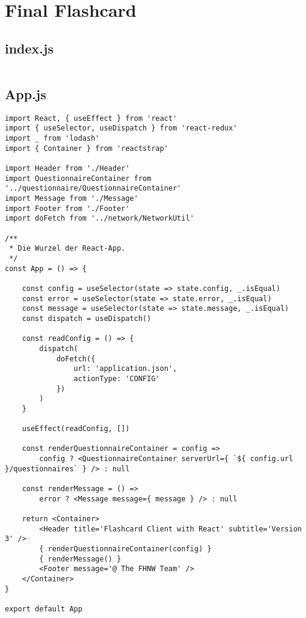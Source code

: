 \section{Final Flashcard}

\subsection{index.js}

\inputminted{javascript}{src/index.js}

\subsection{App.js}

\begin{verbatim}
import React, { useEffect } from 'react'
import { useSelector, useDispatch } from 'react-redux'
import _ from 'lodash'
import { Container } from 'reactstrap'

import Header from './Header'
import QuestionnaireContainer from '../questionnaire/QuestionnaireContainer'
import Message from './Message'
import Footer from './Footer'
import doFetch from '../network/NetworkUtil'

/**
 * Die Wurzel der React-App.
 */
const App = () => {

    const config = useSelector(state => state.config, _.isEqual)
    const error = useSelector(state => state.error, _.isEqual)
    const message = useSelector(state => state.message, _.isEqual)
    const dispatch = useDispatch()

    const readConfig = () => {
        dispatch(
            doFetch({
                url: 'application.json',
                actionType: 'CONFIG'
            })
        )
    }

    useEffect(readConfig, [])

    const renderQuestionnaireContainer = config => 
        config ? <QuestionnaireContainer serverUrl={ `${ config.url }/questionnaires` } /> : null

    const renderMessage = () =>
        error ? <Message message={ message } /> : null 

    return <Container>
        <Header title='Flashcard Client with React' subtitle='Version 3' />
        { renderQuestionnaireContainer(config) }
        { renderMessage() }
        <Footer message='@ The FHNW Team' />
    </Container>
}

export default App
\end{verbatim}

